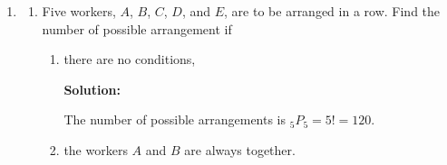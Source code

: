 \documentclass{report}
\newcommand{\sol}{\textbf{Solution:}}
\newcommand\permtwo[2][^n]{{}_{#1}P_{#2}}
\begin{document}
\begin{enumerate}[leftmargin=*]
          \sol{}
          \begin{align*}
              \dfrac{d}{dx}\left(\dfrac{dy}{dx}\right) & = 6x - 8           \\
              \dfrac{dy}{dx}                           & = \int (6x - 8) dx \\
                                                       & = 3x^2 - 8x + c
          \end{align*}
          When $x=1$, $\dfrac{dy}{dx} = 2$.
          \begin{align*}
              2 & = 3(1)^2 - 8(1) + c \\
              c & = 2 - 3 + 8         \\
                & = 7
          \end{align*}
          Therefore $\dfrac{dy}{dx} = 3x^2 - 8x + 7$.
          \begin{align*}
              \dfrac{dy}{dx} & = 3x^2 - 8x + 7           \\
              \int dy        & = \int (3x^2 - 8x + 7) dx \\
              y              & = x^3 - 4x^2 + 7x + c
          \end{align*}
          When $x = 2$, $y = 3$.
          \begin{align*}
              3 & = 2^3 - 4(2)^2 + 7(2) + c \\
              c & = 3 - 8 + 16 - 14         \\
                & = -3
          \end{align*}
          Therefore the equation of the curve is $y = x^3 - 4x^2 + 7x - 3$.

    \item \begin{enumerate}
              \item Five workers, $A$, $B$, $C$, $D$, and $E$, are to be arranged in a row. Find
                    the number of possible arrangement if
                    \begin{enumerate}[]
                        \item there are no conditions,

                              \sol{}

                              The number of possible arrangements is $\permtwo[5]{5} = 5! = 120$.

                        \item the workers $A$ and $B$ are always together.


\end{enumerate}
\end{enumerate}
\end{enumerate}
\end{document}
